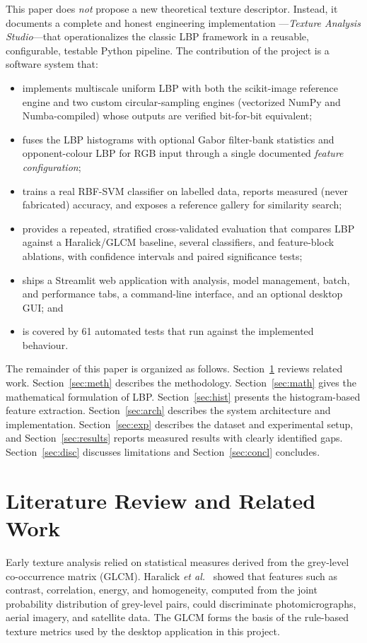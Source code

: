 \documentclass[conference]{IEEEtran}
\begin{document}
This paper does \emph{not} propose a new theoretical texture descriptor.
Instead, it documents a complete and honest engineering implementation
---\emph{Texture Analysis Studio}---that operationalizes the classic LBP
framework in a reusable, configurable, testable Python pipeline. The
contribution of the project is a software system that:
\begin{itemize}
\item implements multiscale uniform LBP with both the scikit-image
reference engine and two custom circular-sampling engines (vectorized
NumPy and Numba-compiled) whose outputs are verified bit-for-bit
equivalent;
\item fuses the LBP histograms with optional Gabor filter-bank statistics
and opponent-colour LBP for RGB input through a single documented
\emph{feature configuration};
\item trains a real RBF-SVM classifier on labelled data, reports measured
(never fabricated) accuracy, and exposes a reference gallery for
similarity search;
\item provides a repeated, stratified cross-validated evaluation that
compares LBP against a Haralick/GLCM baseline, several classifiers, and
feature-block ablations, with confidence intervals and paired significance
tests;
\item ships a Streamlit web application with analysis, model
management, batch, and performance tabs, a command-line interface, and an
optional desktop GUI; and
\item is covered by 61 automated tests that run against the implemented
behaviour.
\end{itemize}

The remainder of this paper is organized as follows. Section~\ref{sec:rel}
reviews related work. Section~\ref{sec:meth} describes the methodology.
Section~\ref{sec:math} gives the mathematical formulation of LBP.
Section~\ref{sec:hist} presents the histogram-based feature extraction.
Section~\ref{sec:arch} describes the system architecture and implementation.
Section~\ref{sec:exp} describes the dataset and experimental setup, and
Section~\ref{sec:results} reports measured results with clearly identified
gaps. Section~\ref{sec:disc} discusses limitations and
Section~\ref{sec:concl} concludes.

\section{Literature Review and Related Work}\label{sec:rel}
Early texture analysis relied on statistical measures derived from the
grey-level co-occurrence matrix (GLCM). Haralick \emph{et al.}~\cite{haralick1973}
showed that features such as contrast, correlation, energy, and homogeneity,
computed from the joint probability distribution of grey-level pairs,
could discriminate photomicrographs, aerial imagery, and satellite data.
The GLCM forms the basis of the rule-based texture metrics used by the
desktop application in this project.
\end{document}
